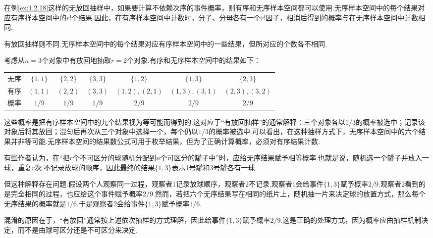 在例\ref{ex:1.2.18}这样的无放回抽样中，如果要计算不依赖次序的事件概率，则有序和无序样本空间都可以使用.无序样本空间中的每个结果对应有序样本空间中的$r!$个结果.因此，在有序样本空间中计数时，分子、分母各有一个$r!$因子，相消后得到的概率与在无序样本空间中计数相同.

有放回抽样则不同.无序样本空间中的每个结果对应有序样本空间中的一些结果，但所对应的个数各不相同.


\begin{example}[有放回抽样]\label{ex:1.2.19}
考虑从$n=3$个对象中有放回地抽取$r=2$个对象.有序和无序样本空间中的结果如下：
\begin{center}\small
\begin{tabular}{ccccccc}\hline
无序 & $\{1,1\}$ & $\{2,2\}$ & $\{3,3\}$ & $\{1,2\}$ & $\{1,3\}$ & $\{2,3\}$\\
有序 & $(1,1)$ & $(2,2)$ & $(3,3)$ & $(1,2),(2,1)$ & $(1,3),(3,1)$ & $(2,3),(3,2)$\\
概率 & $1/9$ & $1/9$ & $1/9$ & $2/9$ & $2/9$ & $2/9$\\\hline
\end{tabular}
\end{center}
这些概率是把有序样本空间中的九个结果视为等可能而得到的.这对应于“有放回抽样”的通常解释：三个对象各以$1/3$的概率被选中；记录该对象后将其放回；混匀后再次从三个对象中选择一个，每个仍以$1/3$的概率被选中.可以看出，在这种抽样方式下，无序样本空间中的六个结果并非等可能.无序样本空间的结果数公式可用于枚举结果，但为了正确计算概率，必须对有序结果计数.
\end{example}
有些作者认为，在“把$r$个不可区分的球随机分配到$n$个可区分的罐子中”时，应给无序结果赋予相等概率.也就是说，随机选一个罐子并放入一球，重复$r$次.不记录放球的顺序，因此最终的结果$\{1,3\}$表示1号罐和3号罐各有一球.

但这种解释存在问题.假设两个人观察同一过程，观察者1记录放球顺序，观察者2不记录.观察者1会给事件$\{1,3\}$赋予概率$2/9$.观察者2看到的是完全相同的过程，也应给这个事件赋予概率$2/9$.然而，若把六个无序结果写在相同的纸片上，随机抽一片来决定球的放置方式，那么每个无序结果的概率就是$1/6$.于是观察者2会给事件$\{1,3\}$赋予概率$1/6$.

混淆的原因在于，“有放回”通常按上述依次抽样的方式理解，因此给事件$\{1,3\}$赋予概率$2/9$.这是正确的处理方式，因为概率应由抽样机制决定，而不是由球可区分还是不可区分来决定.


